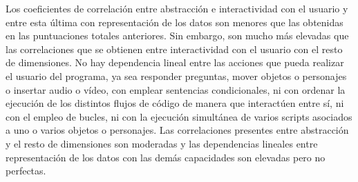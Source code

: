 \documentclass[a4paper, 12pt]{book}
\begin{document}
Los coeficientes de correlación entre abstracción e interactividad con el usuario y entre esta última con representación de los datos son menores que las obtenidas en las puntuaciones totales anteriores. Sin embargo, son mucho más elevadas que las correlaciones que se obtienen entre interactividad con el usuario con el resto de dimensiones. No hay dependencia lineal entre las acciones que pueda realizar el usuario del programa, ya sea responder preguntas, mover objetos o personajes o insertar audio o vídeo, con emplear sentencias condicionales, ni con ordenar la ejecución de los distintos flujos de código de manera que interactúen entre sí, ni con el empleo de bucles, ni con la ejecución simultánea de varios scripts asociados a uno o varios objetos o personajes. Las correlaciones presentes entre abstracción y el resto de dimensiones son moderadas y las dependencias lineales entre representación de los datos con las demás capacidades son elevadas pero no perfectas.
\end{document}
